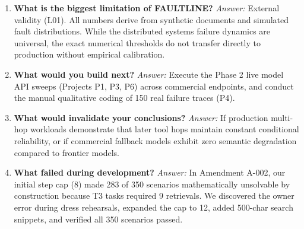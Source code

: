 \begin{enumerate}
    \item \textbf{What is the biggest limitation of FAULTLINE?}
    \newline \textit{Answer:} External validity (L01). All numbers derive from synthetic documents and simulated fault distributions. While the distributed systems failure dynamics are universal, the exact numerical thresholds do not transfer directly to production without empirical calibration.

    \item \textbf{What would you build next?}
    \newline \textit{Answer:} Execute the Phase 2 live model API sweeps (Projects P1, P3, P6) across commercial endpoints, and conduct the manual qualitative coding of 150 real failure traces (P4).

    \item \textbf{What would invalidate your conclusions?}
    \newline \textit{Answer:} If production multi-hop workloads demonstrate that later tool hops maintain constant conditional reliability, or if commercial fallback models exhibit zero semantic degradation compared to frontier models.

    \item \textbf{What failed during development?}
    \newline \textit{Answer:} In Amendment A-002, our initial step cap ($8$) made 283 of 350 scenarios mathematically unsolvable by construction because T3 tasks required 9 retrievals. We discovered the owner error during dress rehearsals, expanded the cap to 12, added 500-char search snippets, and verified all 350 scenarios passed.
\end{enumerate}
